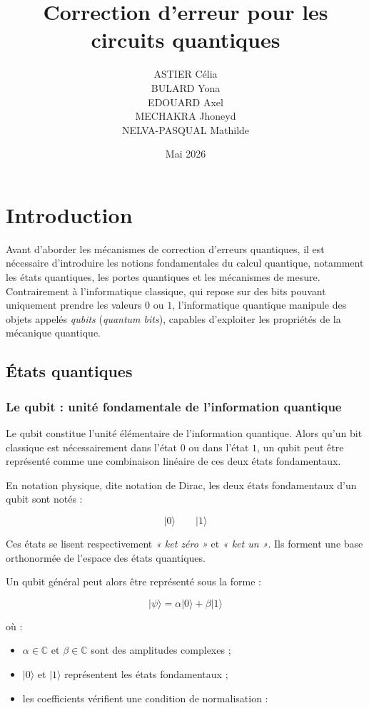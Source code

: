 \documentclass[a4paper,12pt]{article}
\title{Correction d'erreur pour les circuits quantiques}
\author{
ASTIER Célia \\
BULARD Yona \\
EDOUARD Axel \\
MECHAKRA Jhoneyd \\
NELVA-PASQUAL Mathilde
}
\date{Mai 2026}
\begin{document}
\maketitle

\tableofcontents
\newpage

\section{Introduction}

Avant d’aborder les mécanismes de correction d’erreurs quantiques, il est nécessaire d’introduire les notions fondamentales du calcul quantique, notamment les états quantiques, les portes quantiques et les mécanismes de mesure. 
Contrairement à l’informatique classique, qui repose sur des bits pouvant uniquement prendre les valeurs $0$ ou $1$, l’informatique quantique manipule des objets appelés \textit{qubits} (\textit{quantum bits}), capables d’exploiter les propriétés de la mécanique quantique.

\subsection{États quantiques}

\subsubsection{Le qubit : unité fondamentale de l’information quantique}

Le qubit constitue l’unité élémentaire de l’information quantique. Alors qu’un bit classique est nécessairement dans l’état $0$ ou dans l’état $1$, un qubit peut être représenté comme une combinaison linéaire de ces deux états fondamentaux.

En notation physique, dite notation de Dirac, les deux états fondamentaux d’un qubit sont notés :

\[
|0\rangle
\qquad
|1\rangle
\]

Ces états se lisent respectivement \textit{« ket zéro »} et \textit{« ket un »}. Ils forment une base orthonormée de l’espace des états quantiques.

Un qubit général peut alors être représenté sous la forme :

\[
|\psi\rangle
=
\alpha |0\rangle
+
\beta |1\rangle
\]

où :

\begin{itemize}
    \item $\alpha \in \mathbb{C}$ et $\beta \in \mathbb{C}$ sont des amplitudes complexes ;
    \item $|0\rangle$ et $|1\rangle$ représentent les états fondamentaux ;
    \item les coefficients vérifient une condition de normalisation :
\end{itemize}
\end{document}
